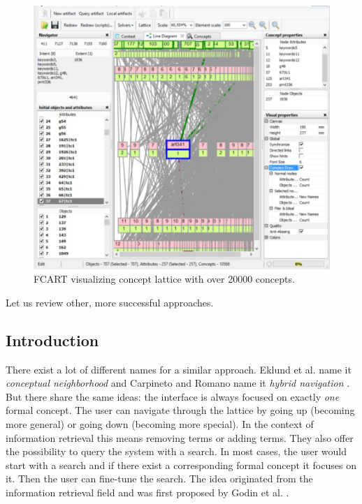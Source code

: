 \documentclass[11pt]{report}
\begin{document}
\begin{figure}[!ht]
	\centering
	\includegraphics[width=\linewidth]{./images/fcart}
\caption{FCART visualizing concept lattice with over 20000 concepts.}
\label{figure:fcart}
\end{figure}

Let us review other, more successful approaches. \\

\subsection{Introduction}

There exist a lot of different names for a similar approach. Eklund et al. name it \textit{conceptual neighborhood}\cite{Eklund2009,Eklund2012} and Carpineto and Romano name it \textit{hybrid navigation} \cite{Carpineto1996}. But there share the same ideas: the interface is always focused on exactly \textit{one} formal concept. The user can navigate through the lattice by going up (becoming more general) or going down (becoming more special). In the context of information retrieval this means removing terms or adding terms. They also offer the possibility to query the system with a search. In most cases, the user would start with a search and if there exist a corresponding formal concept it focuses on it. Then the user can fine-tune the search. The idea originated from the information retrieval field and was first proposed by Godin et al. \cite{Godin1989}. \\
\end{document}
